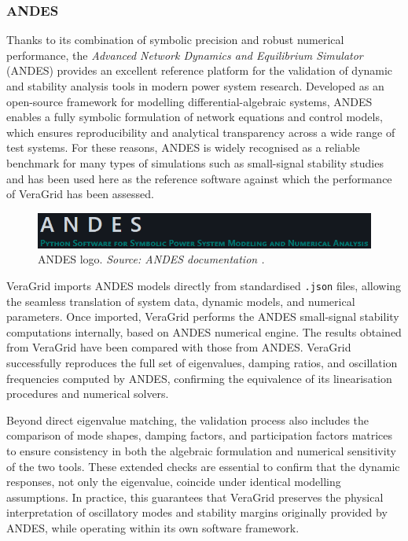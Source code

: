 
\subsubsection{ANDES}

Thanks to its combination of symbolic precision and robust numerical performance, the \textit{Advanced Network Dynamics and Equilibrium Simulator} (ANDES) 
provides an excellent reference platform for the validation of dynamic and stability analysis tools in modern power system research. 
Developed as an open-source framework for modelling differential-algebraic systems, ANDES enables a fully symbolic formulation of network equations and 
control models, which ensures reproducibility and analytical transparency across a wide range of test systems. 
For these reasons, ANDES is widely recognised as a reliable benchmark for many types of simulations such as small-signal stability studies and has been 
used here as the reference software against which the performance of VeraGrid has been assessed.

\begin{figure}[H]
    \centering
    \includegraphics[width=0.9\linewidth]{figures/ANDES_banner.png}
    \caption{ANDES logo. \textit{Source: ANDES documentation \cite{andes}.}}
\end{figure}

VeraGrid imports ANDES models directly from standardised \texttt{.json} files, allowing the seamless translation of system data, dynamic models, 
and numerical parameters. Once imported, VeraGrid performs the ANDES small-signal stability computations internally, based on ANDES numerical engine. 
The results obtained from VeraGrid have been compared with those from ANDES. VeraGrid successfully reproduces the full set of eigenvalues,
damping ratios, and oscillation frequencies computed by ANDES, confirming the equivalence of its linearisation procedures and numerical solvers. 

Beyond direct eigenvalue matching, the validation process also includes the comparison of mode shapes, damping factors, and participation factors
matrices to ensure consistency in both the algebraic formulation and numerical sensitivity of the two tools. These extended checks are essential to 
confirm that the dynamic responses, not only the eigenvalue, coincide under identical modelling assumptions. In practice, this guarantees that VeraGrid 
preserves the physical interpretation of oscillatory modes and stability margins originally provided by ANDES, while operating within its own software framework.

